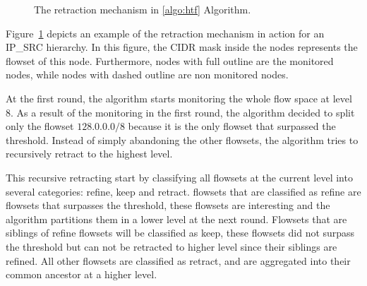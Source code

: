 \begin{figure}
	\centering
    \hfill
\caption{The retraction mechanism in \ref{algo:htf} Algorithm.}
\label{fig:retract}

\end{figure}

Figure~\ref{fig:retract} depicts an example of the retraction mechanism in action for an IP\_SRC hierarchy. In this figure, the CIDR mask inside the nodes represents the flowset of this node. Furthermore, nodes with full outline are the monitored nodes, while nodes with dashed outline are non monitored nodes.

At the first round, the algorithm starts monitoring the whole flow space at level 8. As a result of the monitoring in the first round, the algorithm decided to split only the flowset $128.0.0.0/8$ because it is the only flowset that surpassed the threshold. Instead of simply abandoning the other flowsets, the algorithm tries to recursively retract to the highest level.

This recursive retracting start by classifying all flowsets at the current level into several categories: refine, keep and retract. flowsets that are classified as refine are flowsets that surpasses the threshold, these flowsets are interesting and the algorithm  partitions them in a lower level at the next round. Flowsets that are siblings of refine flowsets will be classified as keep, these flowsets did not surpass the threshold but can not be retracted to higher level since their siblings are refined. All other flowsets are classified as retract, and are aggregated into their common ancestor at a higher level.


